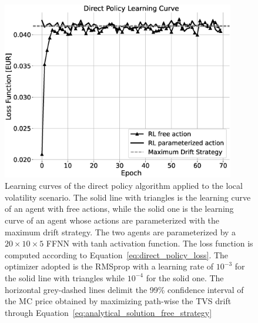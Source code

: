 \documentclass[runningheads]{m2ef}
\begin{document}
	\begin{figure}[h!]
		\centering
		\includegraphics[width=4in]{LV_direct_policy_approach_grey.eps}
		\caption{Learning curves of the direct policy algorithm applied to the local volatility scenario. The solid line with triangles is the learning curve of an agent with free actions, while the solid one is the learning curve of an agent whose actions are parameterized with the maximum drift strategy. The two agents are parameterized by a $20 \times 10 \times 5$ FFNN with tanh activation function. The loss function is computed according to Equation~\eqref{eq:direct_policy_loss}. The optimizer adopted is the RMSprop with a learning rate of $10^{-3}$ for the solid line with triangles while $10^{-4}$ for the solid one. The horizontal grey-dashed lines delimit the 99\% confidence interval of the MC price obtained by maximizing path-wise the TVS drift through Equation~\eqref{eq:analytical_solution_free_strategy}}
		\label{fig:result_lv_direct_policy}
	\end{figure}  
\end{document}
